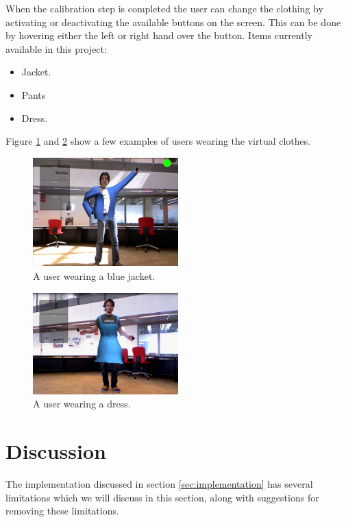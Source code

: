 \documentclass[twocolumn,a4paper]{article}
\begin{document}
When the calibration step is completed the user can change the clothing by activating or deactivating the available buttons on the screen. This can be done by hovering either the left or right hand over the button.
Items currently available in this project:
\begin{itemize}
\item Jacket.
\item Pants 
\item Dress.
\end{itemize}

Figure \ref{fig:jacket_morris} and \ref{fig:dress_fedde} show a few examples of users wearing the virtual clothes.

\begin{figure}[h!]
\centering
\includegraphics[width=0.5\textwidth]{GUI_jacket_morris.png} 
\caption{A user wearing a blue jacket.}
\label{fig:jacket_morris}
\end{figure}

\begin{figure}[h!]
\centering
\includegraphics[width=0.5\textwidth]{dress_fedde.png} 
\caption{A user wearing a dress.}
\label{fig:dress_fedde}
\end{figure}

\section{Discussion}
\label{sec:discussion}

The implementation discussed in section \ref{sec:implementation} has several limitations which we will discuss in this section, along with suggestions for removing these limitations. 
\end{document}
